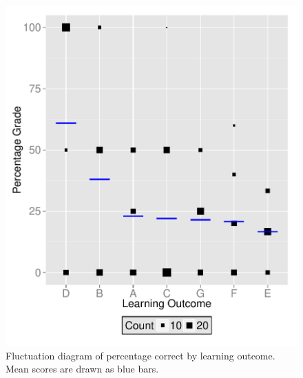 \documentclass[12pt,english,nohyper]{tufte-handout}\usepackage[]{graphicx}\usepackage[]{color}
\begin{document}
\begin{figure}[!ht]
\includegraphics[width=\linewidth]{Topic06_AB_LearningObj_boxplot.pdf}
\caption{Fluctuation diagram of percentage correct by learning outcome. Mean scores are drawn as blue bars.}
\label{fig:LearningObj_summary}
\end{figure}
\end{document}
